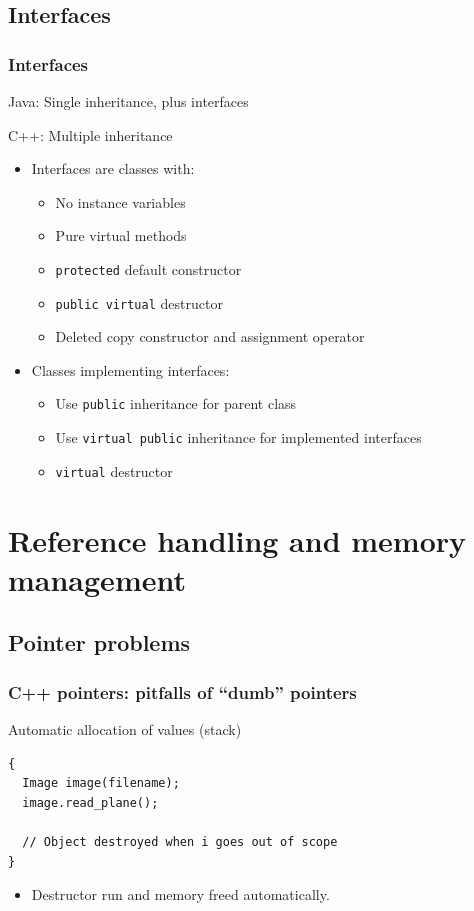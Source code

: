 \documentclass[handout]{beamer}
\begin{document}
\subsection{Interfaces}
\begin{frame}[fragile]
  \frametitle{Interfaces}
\begin{block}{Java: Single inheritance, plus interfaces}
\end{block}
\begin{block}{C++: Multiple inheritance}
  \begin{itemize}
    \pause
  \item Interfaces are classes with:
    \begin{itemize}
      \item No instance variables
      \item Pure virtual methods
      \item \texttt{protected} default constructor
      \item \texttt{public virtual} destructor
      \item Deleted copy constructor and assignment operator
    \end{itemize}
    \pause
  \item Classes implementing interfaces:
    \begin{itemize}
      \item Use \texttt{public} inheritance for parent class
      \item Use \texttt{virtual public} inheritance for implemented interfaces
      \item \texttt{virtual} destructor
    \end{itemize}
  \end{itemize}
\end{block}
\end{frame}

\section{Reference handling and memory management}
\subsection{Pointer problems}
\begin{frame}[fragile]
  \frametitle{C++ pointers: pitfalls of “dumb” pointers}
\begin{block}{Automatic allocation of values (stack)}
  \begin{lstlisting}
{
  Image image(filename);
  image.read_plane();

  // Object destroyed when i goes out of scope
}
\end{lstlisting}
\pause
  \begin{itemize}
    \pause
  \item Destructor run and memory freed automatically.
  \end{itemize}
\end{block}
\end{frame}
\end{document}
